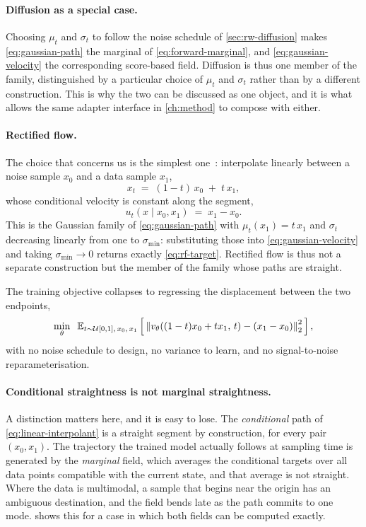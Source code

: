 \paragraph{Diffusion as a special case.} Choosing $\mu_t$ and $\sigma_t$ to
follow the noise schedule of \cref{sec:rw-diffusion} makes
\cref{eq:gaussian-path} the marginal of \cref{eq:forward-marginal}, and
\cref{eq:gaussian-velocity} the corresponding score-based field. Diffusion
is thus one member of the family, distinguished by a particular choice of
$\mu_t$ and $\sigma_t$ rather than by a different construction. This is why
the two can be discussed as one object, and it is what allows the same
adapter interface in \cref{ch:method} to compose with either.

\paragraph{Rectified flow.} The choice that concerns us is the simplest
one~\citep{liu2023rectifiedflow}: interpolate linearly between a noise
sample $x_0$ and a data sample $x_1$,
\begin{equation}
  \label{eq:linear-interpolant}
  x_t \;=\; (1-t)\,x_0 \;+\; t\,x_1,
\end{equation}
whose conditional velocity is constant along the segment,
\begin{equation}
  \label{eq:rf-target}
  u_t(x \mid x_0, x_1) \;=\; x_1 - x_0 .
\end{equation}
This is the Gaussian family of \cref{eq:gaussian-path} with
$\mu_t(x_1) = t\,x_1$ and $\sigma_t$ decreasing linearly from one to
$\sigma_{\min}$: substituting those into \cref{eq:gaussian-velocity} and
taking $\sigma_{\min} \to 0$ returns exactly \cref{eq:rf-target}. Rectified
flow is thus not a separate construction but the member of the family whose
paths are straight.

The training objective collapses to regressing the displacement between the
two endpoints,
\begin{equation}
  \label{eq:rf}
  \min_\theta \;\; \mathbb{E}_{t \sim \mathcal{U}[0,1],\, x_0,\, x_1}
  \left[\, \left\lVert v_\theta\!\left((1-t)x_0 + t x_1,\, t\right) - (x_1 - x_0) \right\rVert_2^2 \,\right],
\end{equation}
with no noise schedule to design, no variance to learn, and no
signal-to-noise reparameterisation. \paragraph{Conditional straightness is not marginal straightness.} A
distinction matters here, and it is easy to lose. The \emph{conditional}
path of \cref{eq:linear-interpolant} is a straight segment by construction,
for every pair $(x_0, x_1)$. The trajectory the trained model actually
follows at sampling time is generated by the \emph{marginal} field, which
averages the conditional targets over all data points compatible with the
current state, and that average is not straight. Where the data is
multimodal, a sample that begins near the origin has an ambiguous
destination, and the field bends late as the path commits to one mode.
 shows this for a case in which both fields
can be computed exactly.

